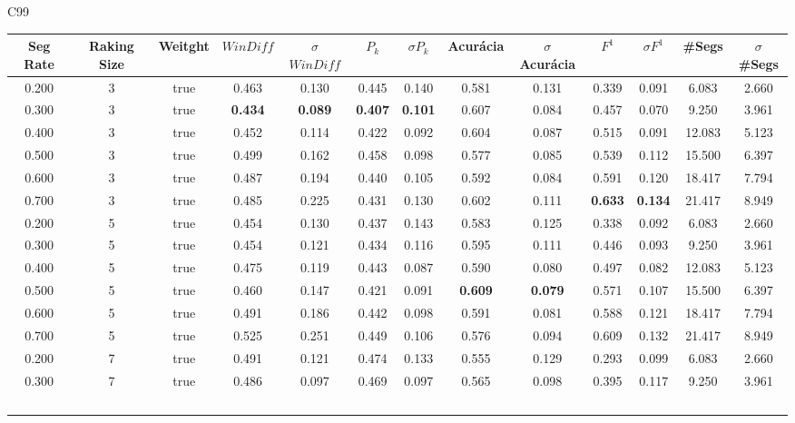  \newpage
\center C99
\begin{longtable}[c]{|c|c|c|c|c|c|c|c|c|c|c|c|c|} 
\hline 
 Seg Rate & Raking Size & Weitght & $WinDiff$ & $\sigma$$WinDiff$ & $P_k$ & $\sigma$$P_k$ & Acurácia & $\sigma$Acurácia & $F^1$ & $\sigma$$F^1$ & \#Segs & $\sigma$\#Segs\\ \hline 
 0.200 & 3 & true & 0.463 & 0.130 & 0.445 & 0.140 & 0.581 & 0.131 & 0.339 & 0.091 & 6.083 & 2.660  \\ \hline 
  0.300 & 3 & true & \cellcolor{gray!20} \textbf{0.434} & \cellcolor{gray!20} \textbf{0.089} & \cellcolor{gray!20} \textbf{0.407} & \cellcolor{gray!20} \textbf{0.101} & 0.607 & 0.084 & 0.457 & 0.070 & 9.250 & 3.961  \\ \hline 
  0.400 & 3 & true & 0.452 & 0.114 & 0.422 & 0.092 & 0.604 & 0.087 & 0.515 & 0.091 & 12.083 & 5.123  \\ \hline 
  0.500 & 3 & true & 0.499 & 0.162 & 0.458 & 0.098 & 0.577 & 0.085 & 0.539 & 0.112 & 15.500 & 6.397  \\ \hline 
  0.600 & 3 & true & 0.487 & 0.194 & 0.440 & 0.105 & 0.592 & 0.084 & 0.591 & 0.120 & 18.417 & 7.794  \\ \hline 
  0.700 & 3 & true & 0.485 & 0.225 & 0.431 & 0.130 & 0.602 & 0.111 & \cellcolor{gray!20} \textbf{0.633} & \cellcolor{gray!20} \textbf{0.134} & 21.417 & 8.949  \\ \hline 
  0.200 & 5 & true & 0.454 & 0.130 & 0.437 & 0.143 & 0.583 & 0.125 & 0.338 & 0.092 & 6.083 & 2.660  \\ \hline 
  0.300 & 5 & true & 0.454 & 0.121 & 0.434 & 0.116 & 0.595 & 0.111 & 0.446 & 0.093 & 9.250 & 3.961  \\ \hline 
  0.400 & 5 & true & 0.475 & 0.119 & 0.443 & 0.087 & 0.590 & 0.080 & 0.497 & 0.082 & 12.083 & 5.123  \\ \hline 
  0.500 & 5 & true & 0.460 & 0.147 & 0.421 & 0.091 & \cellcolor{gray!20} \textbf{0.609} & \cellcolor{gray!20} \textbf{0.079} & 0.571 & 0.107 & 15.500 & 6.397  \\ \hline 
  0.600 & 5 & true & 0.491 & 0.186 & 0.442 & 0.098 & 0.591 & 0.081 & 0.588 & 0.121 & 18.417 & 7.794  \\ \hline 
  0.700 & 5 & true & 0.525 & 0.251 & 0.449 & 0.106 & 0.576 & 0.094 & 0.609 & 0.132 & 21.417 & 8.949  \\ \hline 
  0.200 & 7 & true & 0.491 & 0.121 & 0.474 & 0.133 & 0.555 & 0.129 & 0.293 & 0.099 & 6.083 & 2.660  \\ \hline 
  0.300 & 7 & true & 0.486 & 0.097 & 0.469 & 0.097 & 0.565 & 0.098 & 0.395 & 0.117 & 9.250 & 3.961  \\ \hline 
$$
\end{longtable}
